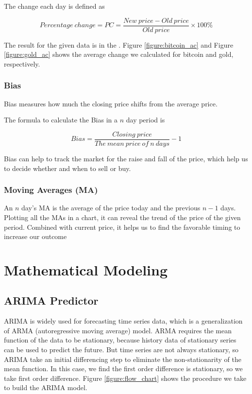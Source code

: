 \documentclass[12pt,a4paper]{article}
\newcommand{\Predictor}{ARIMA }
\begin{document}
\begin{spacing}{1.2}
The change each day is defined as

$$
Percentage \ change = PC = \frac{New \ price-Old \ price}{Old \ price} \times 100\%
$$


The result for the given data is in the . Figure \ref{figure:bitcoin_ac} and Figure \ref{figure:gold_ac} shows the average change we calculated for bitcoin and gold, respectively.


\subsubsection{Bias}

Bias measures how much the closing price shifts from the average price.

The formula to calculate the Bias in a $n$ day period is

$$
Bias = \frac{Closing \ price}{The \ mean \ price \ of \ n \ days} - 1
$$

Bias can help to track the market for the raise and fall of the price, which help us to decide whether and when to sell or buy.

\subsubsection{Moving Averages (MA)}

An $n$ day's MA is the average of the price today and the previous $n-1$ days. Plotting all the MAs in a chart, it can reveal the trend of the price of the given period. Combined with current price, it helps us to find the favorable timing to increase our outcome

\section{Mathematical Modeling}
\label{MathModels}

\subsection{\Predictor Predictor}

\Predictor is widely used for forecasting time series data, which is a generalization of ARMA (autoregressive moving average) model. ARMA requires the mean function of the data to be stationary, because history data of stationary series can be used to predict the future. But time series are not always stationary, so ARIMA take an initial differencing step to eliminate the non-stationarity of the mean function. In this case, we find the first order difference is stationary, so we take first order difference. Figure \ref{figure:flow_chart} shows the procedure we take to build the \Predictor model.


\end{spacing}
\end{document}
